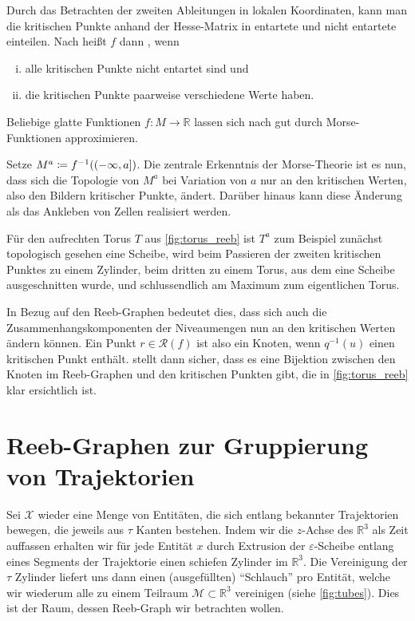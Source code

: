 Durch das Betrachten der zweiten Ableitungen in lokalen Koordinaten, kann man die kritischen Punkte anhand der Hesse-Matrix in entartete und nicht entartete einteilen. 
Nach \textcite{compTopo} heißt $f$ dann , wenn 
\begin{enumerate}[(i)]
	\item alle kritischen Punkte nicht entartet sind und
	\item\label{enum:def:morse:2} die kritischen Punkte paarweise verschiedene Werte haben. 
\end{enumerate}
Beliebige glatte Funktionen $f \colon M \to \mathbb{R}$ lassen sich nach \textcite[Corr.~6.8]{MilnorMorse} gut durch Morse-Funktionen approximieren.

Setze $M^a \coloneqq f^{-1}\enbrace*{(-\infty,a]}$.
Die zentrale Erkenntnis der Morse-Theorie ist es nun, dass sich die Topologie von $M^a$ bei Variation von $a$ nur an den kritischen Werten, also den Bildern kritischer Punkte, ändert.
Darüber hinaus kann diese Änderung als das Ankleben von Zellen realisiert werden.

Für den aufrechten Torus $T$ aus \cref{fig:torus_reeb} ist $T^a$ zum Beispiel zunächst topologisch gesehen eine Scheibe, wird beim Passieren der zweiten kritischen Punktes zu einem Zylinder, beim dritten zu einem Torus, aus dem eine Scheibe ausgeschnitten wurde, und schlussendlich am Maximum zum eigentlichen Torus.

In Bezug auf den Reeb-Graphen bedeutet dies, dass sich auch die Zusammenhangskomponenten der Niveaumengen nun an den kritischen Werten ändern können.
Ein Punkt $r \in \mathcal{R}(f)$ ist also ein Knoten, wenn $q^{-1}(u)$ einen kritischen Punkt enthält.
 stellt dann sicher, dass es eine Bijektion zwischen den Knoten im Reeb-Graphen und den kritischen Punkten gibt, die in \cref{fig:torus_reeb} klar ersichtlich ist.



\section{Reeb-Graphen zur Gruppierung von Trajektorien} %
\label{sec:trajek_reeb}
Sei $\mathcal{X}$ wieder eine Menge von Entitäten, die sich entlang bekannter Trajektorien bewegen, die jeweils aus $\tau$ Kanten bestehen.
Indem wir die $z$-Achse des $\mathbb{R}^3$ als Zeit auffassen erhalten wir für jede Entität $x$ durch Extrusion der $\varepsilon$-Scheibe entlang eines Segments der Trajektorie einen schiefen Zylinder im $\mathbb{R}^3$.
Die Vereinigung der $\tau$ Zylinder liefert uns dann einen (ausgefüllten) \enquote{Schlauch} pro Entität, welche wir wiederum alle zu einem Teilraum $\mathcal{M} \subset \mathbb{R}^3$ vereinigen (siehe \cref{fig:tubes}).
Dies ist der Raum, dessen Reeb-Graph wir betrachten wollen.

